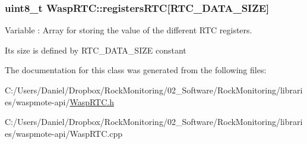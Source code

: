 \subsubsection[{\texorpdfstring{registers\+R\+TC}{registersRTC}}]{\setlength{\rightskip}{0pt plus 5cm}uint8\+\_\+t Wasp\+R\+T\+C\+::registers\+R\+TC\mbox{[}{\bf R\+T\+C\+\_\+\+D\+A\+T\+A\+\_\+\+S\+I\+ZE}\mbox{]}}\hypertarget{class_wasp_r_t_c_abd6b0ce126ca222db1ce3a7d97d9c9c2}{}\label{class_wasp_r_t_c_abd6b0ce126ca222db1ce3a7d97d9c9c2}


Variable \+: Array for storing the value of the different R\+TC registers. 

Its size is defined by \textquotesingle{}R\+T\+C\+\_\+\+D\+A\+T\+A\+\_\+\+S\+I\+ZE\textquotesingle{} constant 

The documentation for this class was generated from the following files\+:\begin{DoxyCompactItemize}
\item 
C\+:/\+Users/\+Daniel/\+Dropbox/\+Rock\+Monitoring/02\+\_\+\+Software/\+Rock\+Monitoring/libraries/waspmote-\/api/\hyperlink{_wasp_r_t_c_8h}{Wasp\+R\+T\+C.\+h}\item 
C\+:/\+Users/\+Daniel/\+Dropbox/\+Rock\+Monitoring/02\+\_\+\+Software/\+Rock\+Monitoring/libraries/waspmote-\/api/Wasp\+R\+T\+C.\+cpp\end{DoxyCompactItemize}
